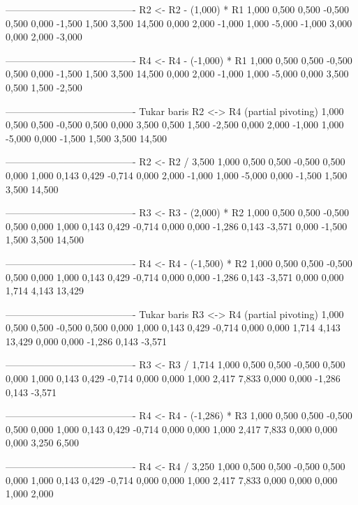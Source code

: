 \documentclass[12pt]{article}
\begin{document}
\begin{enumerate}
\begin{keluaran}
----------------------------------------
R2 <- R2 - (1,000) * R1
1,000   0,500   0,500   -0,500  0,500
0,000   -1,500  1,500   3,500   14,500
0,000   2,000   -1,000  1,000   -5,000
-1,000  3,000   0,000   2,000   -3,000

----------------------------------------
R4 <- R4 - (-1,000) * R1
1,000   0,500   0,500   -0,500  0,500
0,000   -1,500  1,500   3,500   14,500
0,000   2,000   -1,000  1,000   -5,000
0,000   3,500   0,500   1,500   -2,500

----------------------------------------
Tukar baris R2 <-> R4 (partial pivoting)
1,000   0,500   0,500   -0,500  0,500
0,000   3,500   0,500   1,500   -2,500
0,000   2,000   -1,000  1,000   -5,000
0,000   -1,500  1,500   3,500   14,500

----------------------------------------
R2 <- R2 / 3,500
1,000   0,500   0,500   -0,500  0,500
0,000   1,000   0,143   0,429   -0,714
0,000   2,000   -1,000  1,000   -5,000
0,000   -1,500  1,500   3,500   14,500

----------------------------------------
R3 <- R3 - (2,000) * R2
1,000   0,500   0,500   -0,500  0,500
0,000   1,000   0,143   0,429   -0,714
0,000   0,000   -1,286  0,143   -3,571
0,000   -1,500  1,500   3,500   14,500

----------------------------------------
R4 <- R4 - (-1,500) * R2
1,000   0,500   0,500   -0,500  0,500
0,000   1,000   0,143   0,429   -0,714
0,000   0,000   -1,286  0,143   -3,571
0,000   0,000   1,714   4,143   13,429

----------------------------------------
Tukar baris R3 <-> R4 (partial pivoting)
1,000   0,500   0,500   -0,500  0,500
0,000   1,000   0,143   0,429   -0,714
0,000   0,000   1,714   4,143   13,429
0,000   0,000   -1,286  0,143   -3,571

----------------------------------------
R3 <- R3 / 1,714
1,000   0,500   0,500   -0,500  0,500
0,000   1,000   0,143   0,429   -0,714
0,000   0,000   1,000   2,417   7,833
0,000   0,000   -1,286  0,143   -3,571

----------------------------------------
R4 <- R4 - (-1,286) * R3
1,000   0,500   0,500   -0,500  0,500
0,000   1,000   0,143   0,429   -0,714
0,000   0,000   1,000   2,417   7,833
0,000   0,000   0,000   3,250   6,500

----------------------------------------
R4 <- R4 / 3,250
1,000   0,500   0,500   -0,500  0,500
0,000   1,000   0,143   0,429   -0,714
0,000   0,000   1,000   2,417   7,833
0,000   0,000   0,000   1,000   2,000


\end{keluaran}
\end{enumerate}
\end{document}
